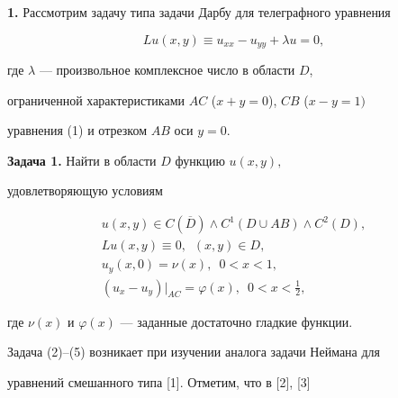 \maketitle


\label{begin}








{\bf 1.} Рассмотрим задачу типа задачи Дарбу для телеграфного уравнения


\begin{equation}


Lu(x,y)\equiv u_{xx}-u_{yy}+\lambda u=0,


\end{equation}


где $\lambda $ --- произвольное комплексное число в области $D$,


ограниченной характеристиками $AC$ ($x+y=0$), $CB$ ($x-y=1)$


уравнения (1) и отрезком $AB$ оси $y=0$.


\medskip





{\bf Задача 1.} Найти в области $D$ функцию $u(x,y),$


удовлетворяющую условиям


\begin{gather}


u(x,y)\in C(\overline D)\land C^1(D\cup AB)\land C^2(D),\\


%


Lu(x,y)\equiv 0,\ \;(x,y)\in D, \\


%


u_y(x,0)=\nu(x),\ \;0<x<1,\\


%


(u_x-u_y)\big |_{AC}=\varphi (x),\ \;0<x<\frac{1}{2},


\end{gather}


где $\nu(x)$ и $\varphi (x)$ --- заданные достаточно гладкие функции.


\medskip





Задача (2)--(5) возникает при изучении аналога задачи Неймана для


уравнений смешанного типа [1]. Отметим, что в [2], [3]


